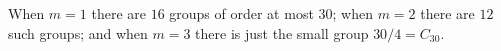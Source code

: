\documentclass[a4paper,11pt]{article}
\theoremstyle{plain}
\theoremstyle{definition}
\begin{document}
\noindent 
When $m=1$ there are $16$ groups of order at most $30$; 
when $m=2$ there are $12$ such groups; 
and when $m=3$ there is just the small group $30/4 = C_{30}$. 

%
%

\end{document}
